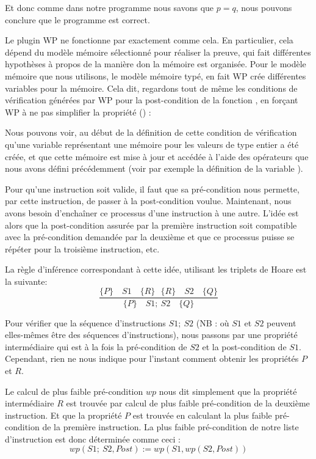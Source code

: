 Et donc comme dans notre programme nous savons que $p = q$, nous pouvons conclure que
le programme est correct.


Le plugin WP ne fonctionne par exactement comme cela. En particulier, cela dépend du
modèle mémoire sélectionné pour réaliser la preuve, qui fait différentes hypothèses à
propos de la manière don la mémoire est organisée. Pour le modèle mémoire que nous 
utilisons, le modèle mémoire typé, en fait WP crée différentes variables pour la mémoire.
Cela dit, regardons tout de même les conditions de vérification générées par WP pour la
post-condition de la fonction , en forçant WP à ne pas simplifier la
propriété () :



Nous pouvons voir, au début de la définition de cette condition de vérification qu'une
variable  représentant une mémoire pour les valeurs de type entier
a été créée, et que cette mémoire est mise à jour et accédée à l'aide des opérateurs que
nous avons défini précédemment (voir par exemple la définition de la variable
).




Pour qu'une instruction soit valide, il faut que sa pré-condition nous 
permette, par cette instruction, de passer à la post-condition voulue. 
Maintenant, nous avons besoin d'enchaîner ce processus d'une 
instruction à une autre. L'idée est alors que la post-condition assurée par la
première instruction soit compatible avec la pré-condition demandée par la 
deuxième et que ce processus puisse se répéter pour la troisième instruction, 
etc.



La règle d'inférence correspondant à cette idée, utilisant les triplets de 
Hoare est la suivante:
$$\dfrac{\{P\}\quad S1 \quad \{R\} \ \ \ \{R\}\quad S2 \quad \{Q\}}{\{P\}\quad S1 ;\ S2 \quad \{Q\}}$$



Pour vérifier que la séquence d'instructions $S1;\ S2$ (NB : où $S1$ et $S2$ 
peuvent elles-mêmes être des séquences d'instructions), nous passons par une 
propriété intermédiaire qui est à la fois la pré-condition de $S2$ et la 
post-condition de $S1$. Cependant, rien ne nous indique pour l'instant 
comment obtenir les propriétés $P$ et $R$.



Le calcul de plus faible pré-condition $wp$ nous dit simplement que la 
propriété intermédiaire $R$ est trouvée par calcul de plus faible pré-condition
de la deuxième instruction. Et que la propriété $P$ est trouvée en calculant la
plus faible pré-condition de la première instruction. La plus faible pré-condition
de notre liste d'instruction est donc déterminée comme ceci :
$$wp(S1;\ S2 , Post) := wp(S1, wp(S2, Post) )$$



